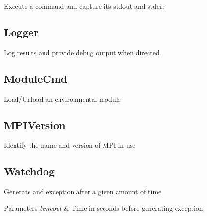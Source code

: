 Execute a command and capture its stdout and stderr\hypertarget{group___utilities_Logger}{}\subsection{Logger}\label{group___utilities_Logger}
Log results and provide debug output when directed\hypertarget{group___utilities_ModuleCmd}{}\subsection{Module\-Cmd}\label{group___utilities_ModuleCmd}
Load/\-Unload an environmental module\hypertarget{group___utilities_MPIVersion}{}\subsection{M\-P\-I\-Version}\label{group___utilities_MPIVersion}
Identify the name and version of M\-P\-I in-\/use\hypertarget{group___utilities_Watchdog}{}\subsection{Watchdog}\label{group___utilities_Watchdog}
Generate and exception after a given amount of time 
\begin{DoxyParams}{Parameters}
{\em timeout} & Time in seconds before generating exception \\
\hline
\end{DoxyParams}

